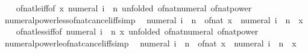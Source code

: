 \begin{isabellebody}
%
\isadelimproof
\ \ %
\endisadelimproof
%
\isatagproof
{}\isamarkupfalse%
\ of{\isacharunderscore}{\kern0pt}nat{\isacharunderscore}{\kern0pt}le{\isacharunderscore}{\kern0pt}iff{\isacharbrackleft}{\kern0pt}of\ x\ {\isachardoublequoteopen}numeral\ i\ {\isacharcircum}{\kern0pt}\ n{\isachardoublequoteclose}{\isacharcomma}{\kern0pt}\ unfolded\ of{\isacharunderscore}{\kern0pt}nat{\isacharunderscore}{\kern0pt}numeral\ of{\isacharunderscore}{\kern0pt}nat{\isacharunderscore}{\kern0pt}power{\isacharbrackright}{\kern0pt}\ \isacommand{{\isachardot}{\kern0pt}}\isamarkupfalse%
%
\endisatagproof
{\isafoldproof}%
%
\isadelimproof
\isanewline
%
\endisadelimproof
\isanewline
{}\isamarkupfalse%
\ numeral{\isacharunderscore}{\kern0pt}power{\isacharunderscore}{\kern0pt}less{\isacharunderscore}{\kern0pt}of{\isacharunderscore}{\kern0pt}nat{\isacharunderscore}{\kern0pt}cancel{\isacharunderscore}{\kern0pt}iff{\isacharbrackleft}{\kern0pt}simp{\isacharbrackright}{\kern0pt}{\isacharcolon}{\kern0pt}\isanewline
\ \ {\isachardoublequoteopen}numeral\ i\ {\isacharcircum}{\kern0pt}\ n\ {\isacharless}{\kern0pt}\ of{\isacharunderscore}{\kern0pt}nat\ x\ {\isasymlongleftrightarrow}\ numeral\ i\ {\isacharcircum}{\kern0pt}\ n\ {\isacharless}{\kern0pt}\ x{\isachardoublequoteclose}\isanewline
%
\isadelimproof
\ \ %
\endisadelimproof
%
\isatagproof
{}\isamarkupfalse%
\ of{\isacharunderscore}{\kern0pt}nat{\isacharunderscore}{\kern0pt}less{\isacharunderscore}{\kern0pt}iff{\isacharbrackleft}{\kern0pt}of\ {\isachardoublequoteopen}numeral\ i\ {\isacharcircum}{\kern0pt}\ n{\isachardoublequoteclose}\ x{\isacharcomma}{\kern0pt}\ unfolded\ of{\isacharunderscore}{\kern0pt}nat{\isacharunderscore}{\kern0pt}numeral\ of{\isacharunderscore}{\kern0pt}nat{\isacharunderscore}{\kern0pt}power{\isacharbrackright}{\kern0pt}\ \isacommand{{\isachardot}{\kern0pt}}\isamarkupfalse%
%
\endisatagproof
{\isafoldproof}%
%
\isadelimproof
\isanewline
%
\endisadelimproof
\isanewline
{}\isamarkupfalse%
\ numeral{\isacharunderscore}{\kern0pt}power{\isacharunderscore}{\kern0pt}le{\isacharunderscore}{\kern0pt}of{\isacharunderscore}{\kern0pt}nat{\isacharunderscore}{\kern0pt}cancel{\isacharunderscore}{\kern0pt}iff{\isacharbrackleft}{\kern0pt}simp{\isacharbrackright}{\kern0pt}{\isacharcolon}{\kern0pt}\isanewline
\ \ {\isachardoublequoteopen}numeral\ i\ {\isacharcircum}{\kern0pt}\ n\ {\isasymle}\ of{\isacharunderscore}{\kern0pt}nat\ x\ {\isasymlongleftrightarrow}\ numeral\ i\ {\isacharcircum}{\kern0pt}\ n\ {\isasymle}\ x{\isachardoublequoteclose}\isanewline
%
\isadelimproof

\end{isabellebody}
